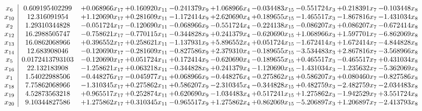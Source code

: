 \documentclass[10pt]{article}
\begin{document}
 \[\begin{array}{c| c c@{\hskip 2pt} c@{\hskip 2pt} c@{\hskip 2pt} c@{\hskip 2pt} c@{\hskip 2pt} c@{\hskip 2pt} c@{\hskip 2pt} c@{\hskip 2pt} }
 x_{6}   &  0.609195402299 & + 0.068966 x_{17} & + 0.160920 x_{11} & -0.241379 x_{9} & + 1.068966 x_{4} & -0.034483 x_{15} & -0.551724 x_{3} & + 0.218391 x_{7} & -0.103448 x_{8}\\
 x_{10}   &  12.316091954 & + 1.120690 x_{17} & + 0.281609 x_{11} & -1.172414 x_{9} & + 2.620690 x_{4} & + 0.189655 x_{15} & -1.465517 x_{3} & -1.867816 x_{7} & -1.431034 x_{8}\\
 x_{2}   &  1.29310344828 & -0.051724 x_{17} & -0.120690 x_{11} & -0.068966 x_{9} & -0.551724 x_{4} & -0.224138 x_{15} & -0.086207 x_{3} & + 0.086207 x_{7} & -0.672414 x_{8}\\
 x_{12}   &  16.2988505747 & -0.758621 x_{17} & -0.770115 x_{11} & -0.344828 x_{9} & + 0.241379 x_{4} & -0.620690 x_{15} & + 1.068966 x_{3} & + 1.597701 x_{7} & -6.862069 x_{8}\\
 x_{13}   &  16.0862068966 & + 0.396552 x_{17} & + 0.258621 x_{11} & -1.137931 x_{9} & + 5.896552 x_{4} & + 0.051724 x_{15} & -1.672414 x_{3} & + 1.672414 x_{7} & -4.844828 x_{8}\\
 x_{14}   &  12.683908046 & -0.120690 x_{17} & -0.281609 x_{11} & -0.827586 x_{9} & + 2.379310 x_{4} & -0.189655 x_{15} & -3.534483 x_{3} & + 2.867816 x_{7} & -3.568966 x_{8}\\
 x_{5}   &  0.0172413793103 & -0.120690 x_{17} & + 0.051724 x_{11} & + 0.172414 x_{9} & -0.620690 x_{4} & -0.189655 x_{15} & + 0.465517 x_{3} & -0.465517 x_{7} & + 0.431034 x_{8}\\
 x_{16}   &  22.132183908 & -1.258621 x_{17} & + 0.063218 x_{11} & -0.344828 x_{9} & + 0.241379 x_{4} & -1.120690 x_{15} & -1.431034 x_{3} & -1.235632 x_{7} & -5.362069 x_{8}\\
 x_{1}   &  1.54022988506 & -0.448276 x_{17} & -0.045977 x_{11} & + 0.068966 x_{9} & -0.448276 x_{4} & -0.275862 x_{15} & + 0.586207 x_{3} & + 0.080460 x_{7} & -0.827586 x_{8}\\
 x_{18}   &  7.75862068966 & -1.310345 x_{17} & + 0.275862 x_{11} & + 0.586207 x_{9} & -2.310345 x_{4} & -0.344828 x_{15} & + 0.482759 x_{3} & -2.482759 x_{7} & -2.034483 x_{8}\\
 x_{19}   &  4.52873563218 & + 0.965517 x_{17} & + 0.252874 x_{11} & + 0.620690 x_{9} & -1.034483 x_{4} & + 0.517241 x_{15} & + 1.275862 x_{3} & -1.942529 x_{7} & + 3.551724 x_{8}\\
 x_{20}   &  9.10344827586 & + 1.275862 x_{17} & + 0.310345 x_{11} & -0.965517 x_{9} & + 1.275862 x_{4} & + 0.862069 x_{15} & -5.206897 x_{3} & + 1.206897 x_{7} & -2.413793 x_{8}\\

\end{array}\]
\end{document}
